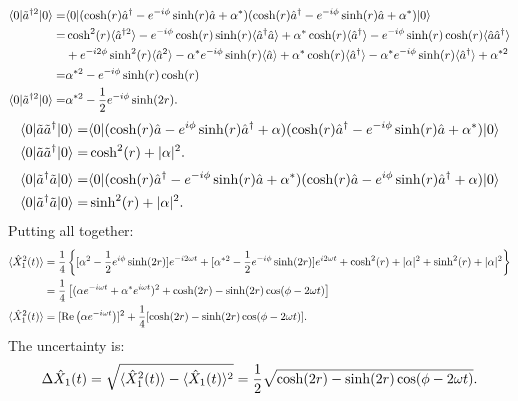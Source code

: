 \begin{align*}
\langle0|\tilde{a}^{\dagger2}|0\rangle=&\langle0|(\cosh(r)\hat{a}^\dagger-e^{-i\phi}\sinh(r)\hat{a}+\alpha^*)(\cosh(r)\hat{a}^\dagger-e^{-i\phi}\sinh(r)\hat{a}+\alpha^*)|0\rangle\\
=&\cosh^2(r)\langle\hat{a}^{\dagger2}\rangle-e^{-i\phi}\cosh(r)\sinh(r)\langle\hat{a}^\dagger\hat{a}\rangle+\alpha^*\cosh(r)\langle\hat{a}^\dagger\rangle-e^{-i\phi}\sinh(r)\cosh(r)\langle\hat{a}\hat{a}^\dagger\rangle\\
&+e^{-i2\phi}\sinh^2(r)\langle\hat{a}^2\rangle-\alpha^*e^{-i\phi}\sinh(r)\langle\hat{a}\rangle+\alpha^*\cosh(r)\langle\hat{a}^\dagger\rangle-\alpha^*e^{-i\phi}\sinh(r)\langle\hat{a}^\dagger\rangle+\alpha^{*2}\\
=&\alpha^{*2}-e^{-i\phi}\sinh(r)\cosh(r)\\
\langle0|\tilde{a}^{\dagger2}|0\rangle=&\alpha^{*2}-\frac{1}{2}e^{-i\phi}\sinh(2r).
\end{align*}
\begin{align*}
\langle0|\tilde{a}\tilde{a}^\dagger|0\rangle=&\langle0|(\cosh(r)\hat{a}-e^{i\phi}\sinh(r)\hat{a}^\dagger+\alpha)(\cosh(r)\hat{a}^\dagger-e^{-i\phi}\sinh(r)\hat{a}+\alpha^*)|0\rangle\\
\langle0|\tilde{a}\tilde{a}^\dagger|0\rangle=&\cosh^2(r)+|\alpha|^2.
\end{align*}
\begin{align*}
\langle0|\tilde{a}^\dagger\tilde{a}|0\rangle=&\langle0|(\cosh(r)\hat{a}^\dagger-e^{-i\phi}\sinh(r)\hat{a}+\alpha^*)(\cosh(r)\hat{a}-e^{i\phi}\sinh(r)\hat{a}^\dagger+\alpha)|0\rangle\\
\langle0|\tilde{a}^\dagger\tilde{a}|0\rangle=&\sinh^2(r)+|\alpha|^2.
\end{align*}
Putting all together:
\begin{align*}
\langle\hat{X}_1^2(t)\rangle&=\frac{1}{4}\left\{[\alpha^2-\frac{1}{2}e^{i\phi}\sinh(2r)]e^{-i2\omega t}+[\alpha^{*2}-\frac{1}{2}e^{-i\phi}\sinh(2r)]e^{i2\omega t}+
\cosh^2(r)+|\alpha|^2+\sinh^2(r)+|\alpha|^2\right\}\\
&=\frac{1}{4}\left[(\alpha e^{-i\omega t}+\alpha^*e^{i\omega t})^2+\cosh(2r)-\sinh(2r)\cos(\phi-2\omega t)\right]\\
\langle\hat{X}_1^2(t)\rangle&=[\text{Re}\left(\alpha e^{-i\omega t}\right)]^2+\frac{1}{4}[\cosh(2r)-\sinh(2r)\cos(\phi-2\omega t)].
\end{align*}
The uncertainty is:
\begin{align*}
\Delta\hat{X}_1(t)=\sqrt{\langle\hat{X}_1^2(t)\rangle-\langle\hat{X}_1(t)\rangle^2}=\frac{1}{2}\sqrt{\cosh(2r)-\sinh(2r)\cos(\phi-2\omega t)}.
\end{align*}

